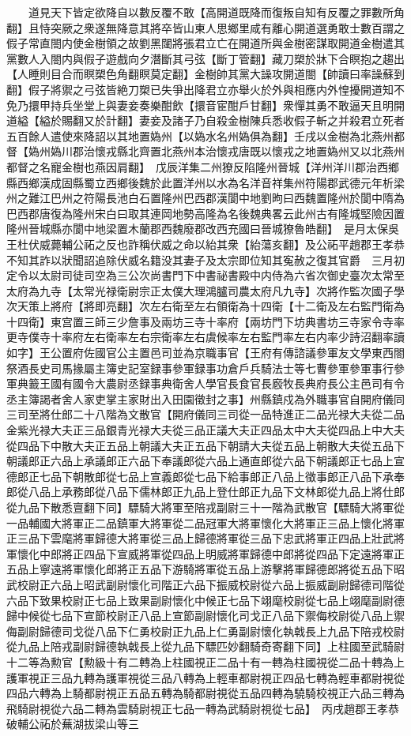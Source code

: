 　　道見天下皆定欲降自以數反覆不敢【高開道既降而復叛自知有反覆之罪數所角翻】且恃突厥之衆遂無降意其將卒皆山東人思鄉里咸有離心開道選勇敢士數百謂之假子常直閤内使金樹領之故劉黑闥將張君立亡在開道所與金樹密謀取開道金樹遣其黨數人入閤内與假子遊戲向夕潛斷其弓弦【斷丁管翻】藏刀槊於牀下合瞑抱之趨出【人睡則目合而瞑槊色角翻瞑莫定翻】金樹帥其黨大譟攻開道閤【帥讀曰率譟蘇到翻】假子將禦之弓弦皆絶刀槊已失爭出降君立亦舉火於外與相應内外惶擾開道知不免乃擐甲持兵坐堂上與妻妾奏樂酣飲【擐音宦酣戶甘翻】衆憚其勇不敢逼天且明開道縊【縊於賜翻又於計翻】妻妾及諸子乃自殺金樹陳兵悉收假子斬之并殺君立死者五百餘人遣使來降詔以其地置媯州【以媯水名州媯俱為翻】壬戌以金樹為北燕州都督【媯州媯川郡治懷戎縣北齊置北燕州本治懷戎唐既以懷戎之地置媯州又以北燕州都督之名寵金樹也燕因肩翻】　戊辰洋集二州獠反陷隆州晉城【洋州洋川郡治西鄉縣西鄉漢成固縣蜀立西鄉後魏於此置洋州以水為名洋音祥集州符陽郡武德元年析梁州之難江巴州之符陽長池白石置隆州巴西郡漢閬中地劉昫曰西魏置隆州於閬中隋為巴西郡唐復為隆州宋白曰取其連岡地勢高隆為名後魏典畧云此州古有隆城堅險因置隆州晉城縣亦閬中地梁置木蘭郡西魏廢郡改西充國曰晉城獠魯皓翻】　是月太保吳王杜伏威薨輔公祏之反也詐稱伏威之命以紿其衆【紿蕩亥翻】及公祏平趙郡王孝恭不知其詐以狀聞詔追除伏威名籍没其妻子及太宗即位知其寃赦之復其官爵　三月初定令以太尉司徒司空為三公次尚書門下中書祕書殿中内侍為六省次御史臺次太常至太府為九寺【太常光禄衛尉宗正太僕大理鴻臚司農太府凡九寺】次將作監次國子學次天策上將府【將即亮翻】次左右衛至左右領衛為十四衛【十二衛及左右監門衛為十四衛】東宫置三師三少詹事及兩坊三寺十率府【兩坊門下坊典書坊三寺家令寺率更寺僕寺十率府左右衛率左右宗衛率左右虞候率左右監門率左右内率少詩沼翻率讀如字】王公置府佐國官公主置邑司並為京職事官【王府有傳諮議參軍友文學東西閤祭酒長史司馬掾屬主簿史記室録事參軍録事功倉戶兵騎法士等七曹參軍參軍事行參軍典籖王國有國令大農尉丞録事典衛舍人學官長食官長廏牧長典府長公主邑司有令丞主簿謁者舍人家吏掌主家財出入田園徵封之事】州縣鎮戍為外職事官自開府儀同三司至將仕郎二十八階為文散官【開府儀同三司從一品特進正二品光禄大夫從二品金紫光禄大夫正三品銀青光禄大夫從三品正議大夫正四品太中大夫從四品上中大夫從四品下中散大夫正五品上朝議大夫正五品下朝請大夫從五品上朝散大夫從五品下朝議郎正六品上承議郎正六品下奉議郎從六品上通直郎從六品下朝議郎正七品上宣德郎正七品下朝散郎從七品上宣義郎從七品下給事郎正八品上徵事郎正八品下承奉郎從八品上承務郎從八品下儒林郎正九品上登仕郎正九品下文林郎從九品上將仕郎從九品下散悉亶翻下同】驃騎大將軍至陪戎副尉三十一階為武散官【驃騎大將軍從一品輔國大將軍正二品鎮軍大將軍從二品冠軍大將軍懷化大將軍正三品上懷化將軍正三品下雲麾將軍歸德大將軍從三品上歸德將軍從三品下忠武將軍正四品上壯武將軍懷化中郎將正四品下宣威將軍從四品上明威將軍歸德中郎將從四品下定遠將軍正五品上寧遠將軍懷化郎將正五品下游騎將軍從五品上游擊將軍歸德郎將從五品下昭武校尉正六品上昭武副尉懷化司階正六品下振威校尉從六品上振威副尉歸德司階從六品下致果校尉正七品上致果副尉懷化中候正七品下翊麾校尉從七品上翊麾副尉德歸中候從七品下宣節校尉正八品上宣節副尉懷化司戈正八品下禦侮校尉從八品上禦侮副尉歸德司戈從八品下仁勇校尉正九品上仁勇副尉懷化執戟長上九品下陪戎校尉從九品上陪戎副尉歸德執戟長上從九品下驃匹妙翻騎奇寄翻下同】上柱國至武騎尉十二等為勲官【勲級十有二轉為上柱國視正二品十有一轉為柱國視從二品十轉為上護軍視正三品九轉為護軍視從三品八轉為上輕車都尉視正四品七轉為輕車都尉視從四品六轉為上騎都尉視正五品五轉為騎都尉視從五品四轉為驍騎校視正六品三轉為飛騎尉視從六品二轉為雲騎尉視正七品一轉為武騎尉視從七品】　丙戌趙郡王孝恭破輔公祏於蕪湖拔梁山等三